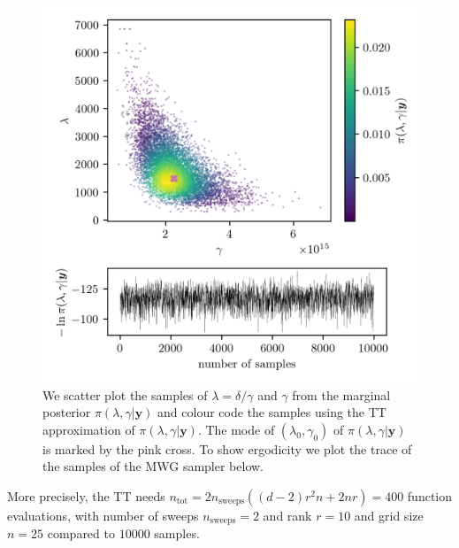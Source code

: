 \begin{figure}[h!]
	\centering
	\includegraphics{ScatterplusHistoPlusTT.png}
	\caption[Scatter plot of samples from marginal posterior, including weighting from TT approximation; trace plot of the marginal posterior samples.]{We scatter plot the samples of $\lambda = \delta / \gamma $ and $\gamma$ from the marginal posterior $\pi(\lambda , \gamma  | \bm{y})$ and colour code the samples using the TT approximation of $\pi(\lambda , \gamma  | \bm{y})$. The mode of $(\lambda_0 , \gamma_0)$ of $\pi(\lambda , \gamma  | \bm{y})$ is marked by the pink cross. To show ergodicity we plot the trace of the samples of the MWG sampler below.}
	\label{fig:ScatterPlotTT}
\end{figure}
More precisely, the TT needs $n_{\text{tot}} = 2n_{\text{sweeps}}((d-2)r^2n+ 2nr) = 400$ function evaluations, with number of sweeps $n_{\text{sweeps}} =2$ and rank $r=10$ and grid size $n = 25$ compared to $10000$ samples.

\clearpage


